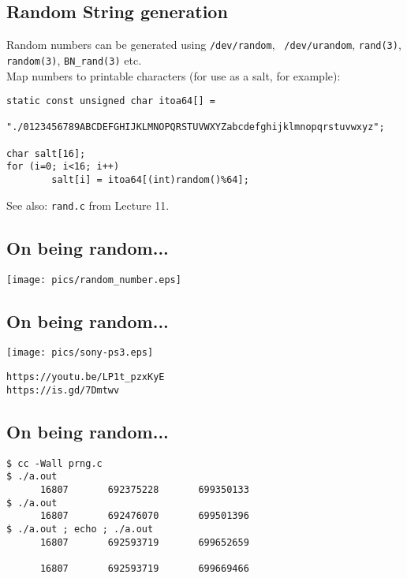 \documentclass[xga]{xdvislides}
\begin{document}
\subsection{Random String generation}
Random numbers can be generated using {\tt /dev/random}, {\tt
/dev/urandom}, {\tt rand(3)}, {\tt random(3)}, {\tt BN\_rand(3)} etc.
\\

Map numbers to printable characters (for use as a salt, for example):

\begin{verbatim}
static const unsigned char itoa64[] =
        "./0123456789ABCDEFGHIJKLMNOPQRSTUVWXYZabcdefghijklmnopqrstuvwxyz";

char salt[16];
for (i=0; i<16; i++)
        salt[i] = itoa64[(int)random()%64];

\end{verbatim}
See also: \verb+rand.c+ from Lecture 11.

\subsection{On being random...}
\begin{center}
        \texttt{[image: pics/random\_number.eps]}
\end{center}

\subsection{On being random...}
\begin{center}
        \texttt{[image: pics/sony-ps3.eps]}
\end{center}

\verb+https://youtu.be/LP1t_pzxKyE+ \\
\verb+https://is.gd/7Dmtwv+

\subsection{On being random...}

\begin{verbatim}
$ cc -Wall prng.c
$ ./a.out
      16807       692375228       699350133
$ ./a.out
      16807       692476070       699501396
$ ./a.out ; echo ; ./a.out
      16807       692593719       699652659

      16807       692593719       699669466
\end{verbatim}
\end{document}
